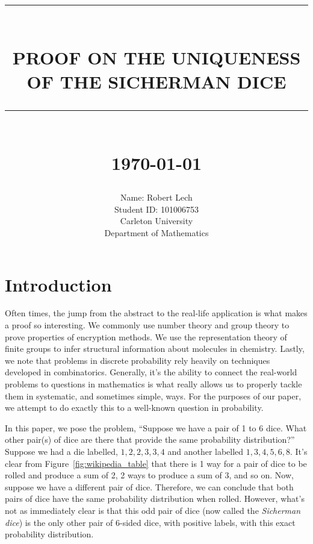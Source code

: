 \documentclass[12pt]{report}
\newcommand{\HRule}[1]{\rule{\linewidth}{#1}}
\begin{document}
\title{ \HRule{0.5pt} \\
		\LARGE \textbf{\uppercase{Proof on the Uniqueness of the Sicherman dice}}
		\HRule{2pt} \\ [0.5cm]
		\normalsize \today \vspace*{5\baselineskip}}

\date{}

\author{
		Name: Robert Lech \\
        Student ID\@: 101006753 \\
		Carleton University \\
		Department of Mathematics }

\maketitle

\sectionfont{\scshape}


\section*{Introduction}
Often times, the jump from the abstract to the real-life application is what makes a proof so interesting. We
commonly use number theory and group theory to prove properties of encryption methods. We use the
representation theory of finite groups to infer structural information about molecules in chemistry. Lastly,
we note that problems in discrete probability rely heavily on techniques developed in combinatorics.
Generally, it's the ability to connect the real-world problems to questions in mathematics is what really
allows us to properly tackle them in systematic, and sometimes simple, ways. For the purposes of our paper, we
attempt to do exactly this to a well-known question in probability.

In this paper, we pose the problem, ``Suppose we have a pair of 1 to 6 dice. What other pair\@(s) of dice are
there that provide the same probability distribution?'' Suppose we had a die labelled, $1,2,2,3,3,4$ and
another labelled $1,3,4,5,6,8$. It's clear from Figure~\ref{fig:wikipedia_table} that there is 1 way for a
pair of dice to be rolled and produce a sum of 2, 2 ways to produce a sum of 3, and so on. Now, suppose we
have a different pair of dice. Therefore, we can conclude that both pairs of dice have the same probability
distribution when rolled. However, what's not as immediately clear is that this odd pair of dice (now called
the \textit{Sicherman dice}) is the only other pair of 6-sided dice, with positive labels, with this exact
probability distribution.
\end{document}
